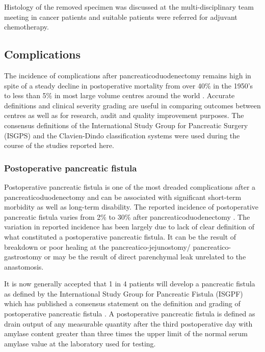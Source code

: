 Histology of the removed specimen was discussed at the multi-disciplinary team meeting in cancer patients and suitable patients were referred for adjuvant chemotherapy.

\subsection{Complications}
The incidence of complications after pancreaticoduodenectomy remains high in spite of a steady decline in postoperative mortality from over 40\% in the 1950's to less than 5\% in most large volume centres around the world \parencite{deoliveira_assessment_2006, emick_hospital_2006, yeo_six_1997, winter_1423_2006, teh_patient_2009, gouma_rates_2000}. 
Accurate definitions and clinical severity grading are useful in comparing outcomes between centres as well as for research, audit and quality improvement purposes. 
The consensus definitions of the International Study Group for Pancreatic Surgery (ISGPS) and the Clavien-Dindo classification systems were used during the course of the studies reported here.

\subsubsection{Postoperative pancreatic fistula}
\label{sec:ch_intro_POPF}



Postoperative pancreatic fistula is one of the most dreaded complications after a pancreaticoduodenectomy and can be associated with significant short-term morbidity as well as long-term disability. 
The reported incidence of postoperative pancreatic fistula varies from 2\% to 30\% after pancreaticoduodenectomy \parencite{yeo_six_1997, deoliveira_assessment_2006, bassi_postoperative_2005, winter_biochemical_2007, pratt_risk_2008}. 
The variation in reported incidence has been largely due to lack of clear definition of what constituted a postoperative pancreatic fistula. 
It can be the result of breakdown or poor healing at the pancreatico-jejunostomy/ pancreatico-gastrostomy or may be the result of direct parenchymal leak unrelated to the anastomosis. 

It is now generally accepted that 1 in 4 patients will develop a pancreatic fistula as defined by the International Study Group for Pancreatic Fistula (ISGPF) which has published a consensus statement on the definition and grading of postoperative pancreatic fistula \parencite{bassi_postoperative_2005}. 
A postoperative pancreatic fistula is defined as drain output of any measurable quantity after the third postoperative day with amylase content greater than three times the upper limit of the normal serum amylase value at the laboratory used for testing. 

